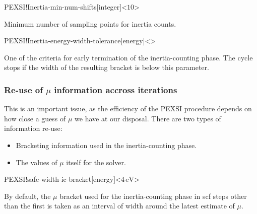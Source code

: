 \begin{fdfentry}{PEXSI!Inertia-min-num-shifts}[integer]<$10$>
  
  Minimum number of sampling points for inertia counts.

\end{fdfentry}

\begin{fdfentry}{PEXSI!Inertia-energy-width-tolerance}[energy]<>

  One of the criteria for early termination of the inertia-counting
  phase.  The cycle stops if the width of the resulting bracket is
  below this parameter.
  
\end{fdfentry}


\subsubsection{Re-use of \texorpdfstring{$\mu$}{u} information accross iterations}

This is an important issue, as the efficiency of the PEXSI procedure
depends on how close a guess of $\mu$ we have at our
disposal. There are two types of information re-use:

\begin{itemize}
  \item%
  Bracketing information used in the inertia-counting phase.
  
  \item%
  The values of $\mu$ itself for the solver.
\end{itemize}

\begin{fdfentry}{PEXSI!safe-width-ic-bracket}[energy]<$4\,\mathrm{eV}$>

  By default, the $\mu$ bracket used for the inertia-counting phase in
  scf steps other than the first is taken as an interval of width
   around the latest estimate of
  $\mu$.
  
\end{fdfentry}


